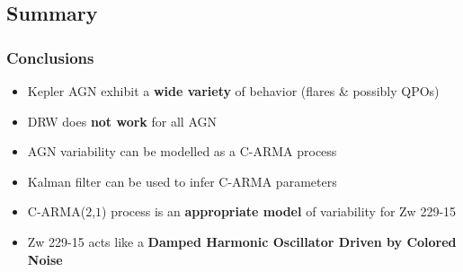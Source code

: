 \documentclass[hyperref={pdfpagelabels=false}]{beamer}
\begin{document}
\subsection{Summary}

\begin{frame}
\frametitle{Conclusions}
  \begin{itemize}
    \item Kepler AGN exhibit a \textbf{wide variety} of behavior (flares \& possibly QPOs)
    \item DRW does \textbf{not work} for all AGN
    \item AGN variability can be modelled as a C-ARMA process
    \item Kalman filter can be used to infer C-ARMA parameters
    \item C-ARMA($2$,$1$) process is an \textbf{appropriate model} of variability for Zw 229-15
    \item Zw 229-15 acts like a \textbf{Damped Harmonic Oscillator Driven by Colored Noise}
  \end{itemize}
\end{frame}
\end{document}
